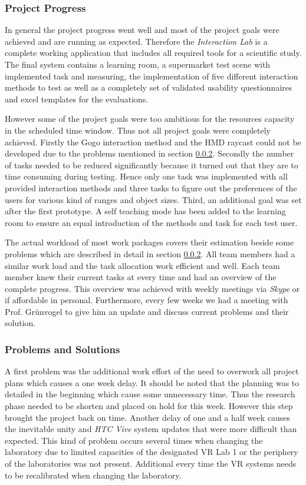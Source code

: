 \subsubsection{Project Progress}

In general the project progress went well and most of the project goals were achieved and are running as expected. Therefore the \textit{Interaction Lab} is a complete working application that includes all required tools for a scientific study. The final system contains a learning room, a supermarket test scene with implemented task and measuring, the implementation of five different interaction methods to test as well as a completely set of validated usability questionnaires and excel templates for the evaluations.

However some of the project goals were too ambitious for the resources capacity in the scheduled time window. Thus not all project goals were completely achieved. Firstly the Gogo interaction method and the HMD raycast could not be developed due to the problems mentioned in section \ref{sec:PMProblems}. Secondly the number of tasks needed to be reduced significantly because it turned out that they are to time consuming during testing. Hence only one task was implemented with all provided interaction methods and three tasks to figure out the preferences of the users for various kind of ranges and object sizes. Third, an additional goal was set after the first prototype. A self teaching mode has been added to the learning room to ensure an equal introduction of the methods and task for each test user.

The actual workload of most work packages covers their estimation beside some problems which are described in detail in section \ref{sec:PMProblems}. All team members had a similar work load and the task allocation work efficient and well. Each team member knew their current tasks at every time and had an overview of the complete progress. This overview was achieved with weekly meetings via \textit{Skype} or if affordable in personal. Furthermore, every few weeks we had a meeting with Prof. Grünvogel to give him an update and discuss current problems and their solution.


\subsubsection{Problems and Solutions}\label{sec:PMProblems}

A first problem was the additional work effort of the need to overwork all project plans which causes a one week delay. It should be noted that the planning was to detailed in the beginning which cause some unnecessary time. Thus the research phase needed to be shorten and placed on hold for this week. However this step brought the project back on time. Another delay of one and a half week causes the inevitable unity and \textit{HTC Vive} system updates that were more difficult than expected. This kind of problem occurs several times when changing the laboratory due to limited capacities of the designated VR Lab 1 or the periphery of the laboratories was not present. Additional every time the VR systems needs to be recalibrated when changing the laboratory.

